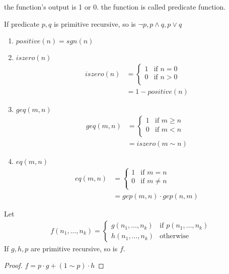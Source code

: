 \begin{definition}
    the function's output is 1 or 0. the function is called predicate function. 
\end{definition}

\begin{corollary}
    If predicate $p, q$ is primitive recursive, so is $\neg p, p\land  q, p\lor q$
\end{corollary}

\begin{enumerate}
    \item $positive(n)=sgn(n)$
    \item $iszero(n)$
    \begin{align*}
        iszero(n)&=\left\{ \begin{array}{ll}
            1 & \text{if }n=0\\
            0 & \text{if }n>0\\
        \end{array} \right.\\
        &=1-positive(n)
    \end{align*}
    \item $geq(m,n)$
    \begin{align*}
        geq(m,n)&=\left\{ \begin{array}{ll}
            1 & \text{if }m\ge n\\
            0 & \text{if }m<n\\
        \end{array} \right.\\
        &=iszero(m\sim n)
    \end{align*}
    \item $eq(m,n)$
    \begin{align*}
        eq(m,n)&=\left\{ \begin{array}{ll}
            1 & \text{if }m= n\\
            0 & \text{if }m\ne n\\
        \end{array} \right.\\
        &=gep(m, n)\cdot gep(n,m)
    \end{align*}
\end{enumerate}

\begin{corollary}
    Let 
    \begin{align*}
        f(n_1,\dots,n_k)=\left\{ \begin{array}{ll}
            g(n_1,\dots,n_k)& \text{if }p(n_1,\dots,n_k)\\
            h(n_1,\dots,n_k)&\text{otherwise}
        \end{array} \right.
    \end{align*}
    If $g,h,p$ are primitive recursive, so is $f$. 
\end{corollary}
\begin{proof}
    $f=p\cdot g+(1\sim p)\cdot h$
\end{proof}

